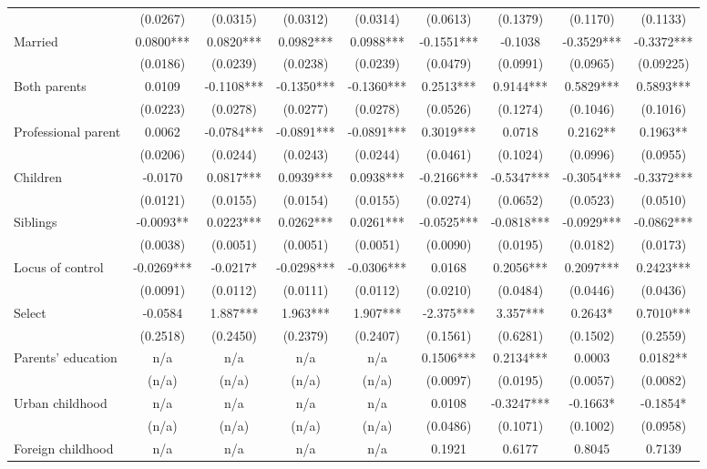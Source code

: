 \documentclass[12pt]{report}
\begin{document}
\begin{sidewaystable}
\begin{tabular}{lc|c|c|c|c|c|c|c}
& (0.0267) & (0.0315) & (0.0312) & (0.0314) & (0.0613) & (0.1379) & (0.1170) & (0.1133)\\
Married & 0.0800*** & 0.0820*** & 0.0982*** & 0.0988*** & -0.1551*** & -0.1038 & -0.3529*** & -0.3372***\\
& (0.0186) & (0.0239) & (0.0238) & (0.0239) & (0.0479) & (0.0991) & (0.0965) & (0.09225)\\
Both parents & 0.0109 & -0.1108*** & -0.1350*** & -0.1360*** & 0.2513*** & 0.9144*** & 0.5829*** & 0.5893***\\
& (0.0223) & (0.0278) & (0.0277) & (0.0278) & (0.0526) & (0.1274) & (0.1046) & (0.1016)\\
Professional parent & 0.0062 & -0.0784*** & -0.0891*** & -0.0891*** & 0.3019*** & 0.0718 & 0.2162** & 0.1963**\\
& (0.0206) & (0.0244) & (0.0243) & (0.0244) & (0.0461) & (0.1024) & (0.0996) & (0.0955)\\
Children & -0.0170 & 0.0817*** & 0.0939*** & 0.0938*** & -0.2166*** & -0.5347*** & -0.3054*** & -0.3372***\\
& (0.0121) & (0.0155) & (0.0154) & (0.0155) & (0.0274) & (0.0652) & (0.0523) & (0.0510)\\
Siblings & -0.0093** & 0.0223*** & 0.0262*** & 0.0261*** & -0.0525*** & -0.0818*** & -0.0929*** & -0.0862***\\
& (0.0038) & (0.0051) & (0.0051) & (0.0051) & (0.0090) & (0.0195) & (0.0182) & (0.0173)\\
Locus of control & -0.0269*** & -0.0217* & -0.0298*** & -0.0306*** & 0.0168 & 0.2056*** & 0.2097*** & 0.2423***\\
& (0.0091) & (0.0112) & (0.0111) & (0.0112) & (0.0210) & (0.0484) & (0.0446) & (0.0436)\\
Select & -0.0584 & 1.887*** & 1.963*** & 1.907*** & -2.375*** & 3.357*** & 0.2643* & 0.7010***\\
& (0.2518) & (0.2450) & (0.2379) & (0.2407) & (0.1561) & (0.6281) & (0.1502) & (0.2559)\\
Parents' education & n/a & n/a & n/a & n/a & 0.1506*** & 0.2134*** & 0.0003 & 0.0182**\\
& (n/a) & (n/a) & (n/a) & (n/a) & (0.0097) & (0.0195) & (0.0057) & (0.0082)\\
Urban childhood & n/a & n/a & n/a & n/a & 0.0108 & -0.3247*** & -0.1663* & -0.1854*\\
& (n/a) & (n/a) & (n/a) & (n/a) & (0.0486) & (0.1071) & (0.1002) & (0.0958)\\
Foreign childhood & n/a & n/a & n/a & n/a & 0.1921 & 0.6177 & 0.8045 & 0.7139\\

\end{tabular}
\end{sidewaystable}
\end{document}

